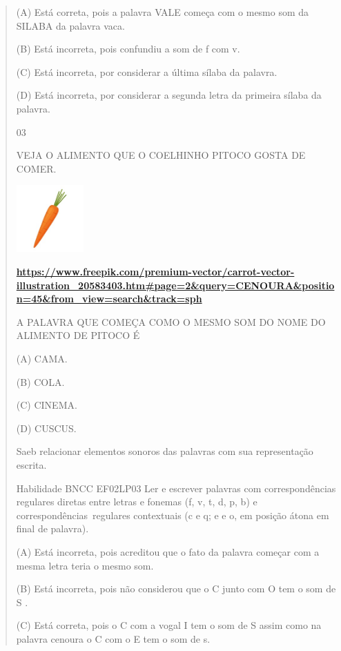\begin{verse}
{{{{{{{{{{{{{{{{\protect\hypertarget{_Hlk129501896}{}{}(A)
\protect\hypertarget{_Hlk129289891}{}{}Está correta, pois a palavra VALE
começa com o mesmo som da SILABA da palavra vaca.

(B) Está incorreta, pois confundiu a som de f com v.

(C) Está incorreta, por considerar a última sílaba da palavra.

(D) Está incorreta, por considerar a segunda letra da primeira sílaba da
palavra.

\num{03}

VEJA O ALIMENTO QUE O COELHINHO PITOCO GOSTA DE COMER.

\includegraphics[width=1.01111in,height=1.01111in]{media/image149.jpeg}

\href{https://www.freepik.com/premium-vector/carrot-vector-illustration_20583403.htm\#page=2\&query=CENOURA\&position=45\&from_view=search\&track=sph}{\textbf{https://www.freepik.com/premium-vector/carrot-vector-illustration\_20583403.htm\#page=2\&query=CENOURA\&position=45\&from\_view=search\&track=sph}}

\protect\hypertarget{_Hlk129504325}{}{}A PALAVRA QUE COMEÇA COMO O MESMO
SOM DO NOME DO ALIMENTO DE PITOCO É

(A) CAMA.

(B) COLA.

(C) CINEMA.

(D) CUSCUS.

Saeb relacionar elementos sonoros das palavras com sua representação
escrita.

Habilidade BNCC EF02LP03 Ler e escrever palavras com correspondências
regulares diretas entre letras e fonemas (f, v, t, d, p, b) e
correspondências~regulares contextuais (c e q; e e o, em posição átona
em final de palavra).

\protect\hypertarget{_Hlk129366993}{}{}(A) Está incorreta, pois
acreditou que o fato da palavra começar com a mesma letra teria o mesmo
som.

(B) Está incorreta, pois não considerou que o C junto com O tem o som de
S .

(C) Está correta, pois o C com a vogal I tem o som de S assim como na
palavra cenoura o C com o E tem o som de s.

}}}}}}}}}}}}}}}}
\end{verse}
